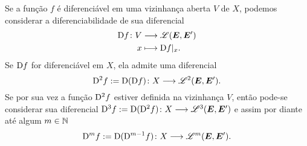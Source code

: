 Se a função $f$ é diferenciável em uma vizinhança aberta $V$ de $X$, podemos considerar a diferenciabilidade de sua diferencial
	\begin{align*}
	{\mathrm{D}f}\colon {V} &\longrightarrow {\mathscr{L}(\bm E, \bm E')} \\{x} &\longmapsto \mathrm{D} f|_x.
	\end{align*}
Se $\mathrm{D} f$ for diferenciável em $X$, ela admite uma diferencial
	\begin{equation*}
	\mathrm{D}^2 f := \mathrm{D} (\mathrm{D} f)\colon \allowbreak X \longrightarrow \mathscr{L}^2(\bm E, \bm E').
	\end{equation*}
Se por sua vez a função $\mathrm{D}^2 f$ estiver definida na vizinhança $V$, então pode-se considerar sua diferencial $\mathrm{D}^3 f := \mathrm{D}(\mathrm{D}^2 f)\colon \allowbreak X \longrightarrow \mathscr{L}^3(\bm E, \bm E')$ e assim por diante até algum $m \in \mathbb{N}$
	\begin{equation*}
	\mathrm{D}^m f := \mathrm{D} (\mathrm{D}^{m-1} f)\colon \allowbreak X \longrightarrow \mathscr{L}^m(\bm E, \bm E').
	\end{equation*}

